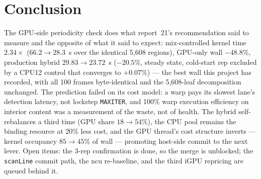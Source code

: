 \documentclass[
	english,
	letterpaper, oneside
]{article}
\begin{document}
\section{Conclusion}

The GPU-side periodicity check does what report~21's recommendation said to
measure and the opposite of what it said to expect: mix-controlled kernel
time $2.34\times$ ($66.2 \to 28.3$~s over the identical 5{,}608 regions),
GPU-only wall $-48.8\%$, production hybrid $29.83 \to 23.72$~s
($-20.5\%$, steady state, cold-start rep excluded by a CPU12
control that converges to $+0.07\%$) --- the best wall this project has
recorded, with all 100 frames byte-identical and the 5{,}608-leaf
decomposition unchanged. The prediction failed on its cost model: a warp
pays its slowest lane's detection latency, not lockstep \texttt{MAXITER},
and 100\% warp execution efficiency on interior content was a measurement
of the waste, not of health. The hybrid self-rebalances a third time (GPU
share $18 \to 54\%$), the CPU pool remains the binding resource at 20\%
less cost, and the GPU thread's cost structure inverts --- kernel occupancy
$85 \to 45\%$ of wall --- promoting host-side commit to the next lever.
Open items: the 3-rep confirmation is done, so the merge is unblocked; the
\texttt{scanLine} commit path, the ncu re-baseline, and the third iGPU
repricing are queued behind it.
\end{document}
